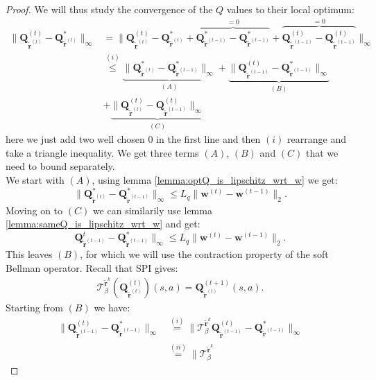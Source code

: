 \begin{proof}
We will thus study the convergence of the $Q$ values to their local optimum:
\begin{align*}
    \|\bm{Q}^{(t)}_{\tilde{\bm{r}}^{(t)}}- \bm{Q}^*_{\tilde{\bm{r}}^{(t)}} \|_\infty 
    &=
    \| \bm{Q}^{(t)}_{\tilde{\bm{r}}^{(t)}}- \bm{Q}^*_{\tilde{\bm{r}}^{(t)}}  +
    \overbrace{\bm{Q}^*_{\tilde{\bm{r}}^{(t-1)}} - \bm{Q}^*_{\tilde{\bm{r}}^{(t-1)}}}^{=0}
    +
    \overbrace{\bm{Q}^{(t)}_{\tilde{\bm{r}}^{(t-1)}} - \bm{Q}^{(t)}_{\tilde{\bm{r}}^{(t-1)}}}^{=0}
    \|_\infty  \\
    &\stackrel{(i)}{\leq} 
    \underbrace{\|  \bm{Q}^*_{\tilde{\bm{r}}^{(t)}} 
    - \bm{Q}^*_{\tilde{\bm{r}}^{(t-1)}} 
    \|_\infty  }_{(A)}
    +
    \underbrace{\|  \bm{Q}^{(t)}_{\tilde{\bm{r}}^{(t-1)}} 
    - \bm{Q}^*_{\tilde{\bm{r}}^{(t-1)}} 
    \|_\infty  }_{(B)} \\ &
    +
    \underbrace{\|  \bm{Q}^{(t)}_{\tilde{\bm{r}}^{(t)}}
    - \bm{Q}^{(t)}_{\tilde{\bm{r}}^{(t-1)}} 
    \|_\infty  }_{(C)}
\end{align*}
here we just add two well chosen $0$ in the first line and then $(i)$ rearrange and take a triangle inequality. We get three terms $(A)$, $(B)$ and $(C)$ that we need to bound separately. \\
\noindent
We start with $(A)$, using lemma \ref{lemma:optQ_is_lipschitz_wrt_w} we get:
\[
    \|  \bm{Q}^*_{\tilde{\bm{r}}^{(t)}} 
    - \bm{Q}^*_{\tilde{\bm{r}}^{(t-1)}} 
    \|_\infty \leq
    L_q \|\bm{w}^{(t)} - \bm{w}^{(t-1)} \|_2.
\]
Moving on to $(C)$ we can similarily use lemma \ref{lemma:sameQ_is_lipschitz_wrt_w} and get:
\[
    \bm{Q}^{t}_{\tilde{\bm{r}}^{(t-1)}} 
    - \bm{Q}^*_{\tilde{\bm{r}}^{(t-1)}} 
    \|_\infty    \leq
    L_q \|\bm{w}^{(t)} - \bm{w}^{(t-1)} \|_2.
\]
This leaves $(B)$, for which we will use the contraction property of the soft Bellman operator. Recall that SPI gives:
\begin{align*}
    \mathcal{T}^{\tilde{\bm{r}}^{k}}_\beta (\bm{Q}^{(t)}_{\tilde{\bm{r}}^{(t)}}  ) (s,a)
    = \bm{Q}^{(t+1)}_{\tilde{\bm{r}}^{(t)}}  (s,a). \tag{SPI-T}
\end{align*}
Starting from $(B)$ we have:
\begin{align*}
    \|  \bm{Q}^{(t)}_{\tilde{\bm{r}}^{(t-1)}} 
    - \bm{Q}^*_{\tilde{\bm{r}}^{(t-1)}} 
    \|_\infty 
    & \stackrel{(i)}{=} 
    \|  
    \mathcal{T}^{\tilde{\bm{r}}^{k}}_\beta \bm{Q}^{(t)}_{\tilde{\bm{r}}^{(t-1)}}  
    - \bm{Q}^*_{\tilde{\bm{r}}^{(t-1)}} 
    \|_\infty  \\
    & \stackrel{(ii)}{=} 
    \|  
    \mathcal{T}^{\tilde{\bm{r}}^{k}}_\beta 

\end{align*}
\end{proof}

